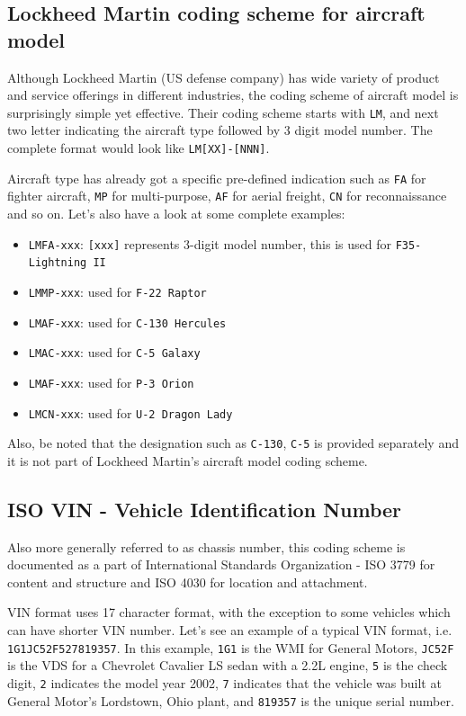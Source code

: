 \subsection{Lockheed Martin coding scheme for aircraft model}

Although Lockheed Martin (US defense company) has wide variety of product and service offerings in different industries, the coding scheme of aircraft model is surprisingly simple yet effective. Their coding scheme starts with \texttt{LM}, and next two letter indicating the aircraft type followed by 3 digit model number. The complete format would look like \texttt{LM[XX]-[NNN]}.

Aircraft type has already got a specific pre-defined indication such as \texttt{FA} for fighter aircraft, \texttt{MP} for multi-purpose, \texttt{AF} for aerial freight, \texttt{CN} for reconnaissance and so on. Let's also have a look at some complete examples:

\begin{itemize}
    \item \texttt{LMFA-xxx}: \texttt{[xxx]} represents 3-digit model number, this is used for \texttt{F35-Lightning II}
    \item \texttt{LMMP-xxx}: used for \texttt{F-22 Raptor}
    \item \texttt{LMAF-xxx}: used for \texttt{C-130 Hercules}
    \item \texttt{LMAC-xxx}: used for \texttt{C-5 Galaxy}
    \item \texttt{LMAF-xxx}: used for \texttt{P-3 Orion}
    \item \texttt{LMCN-xxx}: used for \texttt{U-2 Dragon Lady}
\end{itemize}

Also, be noted that the designation such as \texttt{C-130}, \texttt{C-5} is provided separately and it is not part of Lockheed Martin's aircraft model coding scheme.

\subsection{ISO VIN - Vehicle Identification Number}

Also more generally referred to as chassis number, this coding scheme is documented as a part of International Standards Organization - ISO 3779 for content and structure and ISO 4030 for location and attachment. \cite{ISO4030-1983, ISO3779-2009}

VIN format uses 17 character format, with the exception to some vehicles which can have shorter VIN number. Let's see an example of a typical VIN format, i.e. \texttt{1G1JC52F527819357}. In this example, \texttt{1G1} is the WMI for General Motors, \texttt{JC52F} is the VDS for a Chevrolet Cavalier LS sedan with a 2.2L engine, \texttt{5} is the check digit, \texttt{2} indicates the model year 2002, \texttt{7} indicates that the vehicle was built at General Motor's Lordstown, Ohio plant, and \texttt{819357} is the unique serial number.

